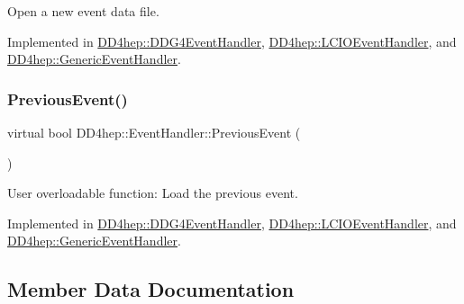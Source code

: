 Open a new event data file. 



Implemented in \hyperlink{class_d_d4hep_1_1_d_d_g4_event_handler_a110e487b2813985f56058382357f0754}{D\+D4hep\+::\+D\+D\+G4\+Event\+Handler}, \hyperlink{class_d_d4hep_1_1_l_c_i_o_event_handler_a67214b5a7675de7d634ac7c1d0cd2c7c}{D\+D4hep\+::\+L\+C\+I\+O\+Event\+Handler}, and \hyperlink{class_d_d4hep_1_1_generic_event_handler_ab1a4e53010cf2aafdef02f8ceafc6ef0}{D\+D4hep\+::\+Generic\+Event\+Handler}.

\hypertarget{class_d_d4hep_1_1_event_handler_a0942608bebbdd107c9dedbdc7311791f}{}\label{class_d_d4hep_1_1_event_handler_a0942608bebbdd107c9dedbdc7311791f} 
\subsubsection{\texorpdfstring{Previous\+Event()}{PreviousEvent()}}
{\footnotesize\ttfamily virtual bool D\+D4hep\+::\+Event\+Handler\+::\+Previous\+Event (\begin{DoxyParamCaption}{ }\end{DoxyParamCaption})\hspace{0.3cm}{\ttfamily [pure virtual]}}



User overloadable function\+: Load the previous event. 



Implemented in \hyperlink{class_d_d4hep_1_1_d_d_g4_event_handler_a20cafa8eac655886d4a3d69338e7e947}{D\+D4hep\+::\+D\+D\+G4\+Event\+Handler}, \hyperlink{class_d_d4hep_1_1_l_c_i_o_event_handler_a178458d67dd58d3f5d701795fcadcd2e}{D\+D4hep\+::\+L\+C\+I\+O\+Event\+Handler}, and \hyperlink{class_d_d4hep_1_1_generic_event_handler_a4b833d9537c7c29b0bfb0d567f98d0a3}{D\+D4hep\+::\+Generic\+Event\+Handler}.



\subsection{Member Data Documentation}
\hypertarget{class_d_d4hep_1_1_event_handler_adccb4980638cdc1ed7792ae8583f1370}{}\label{class_d_d4hep_1_1_event_handler_adccb4980638cdc1ed7792ae8583f1370} 
